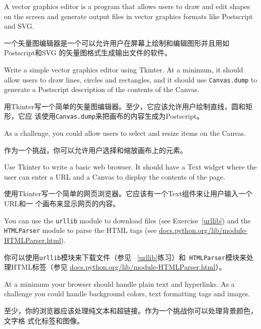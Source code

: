 \documentclass[10pt]{book}
\begin{document}
\begin{CJK}{UTF8}{gbsn}
\begin{exercise}
A vector graphics editor is a program that allows users to draw and
edit shapes on the screen and generate output files in vector graphics
formats like Postscript and SVG.

一个矢量图编辑器是一个可以允许用户在屏幕上绘制和编辑图形并且用如Postscript和SVG
的矢量图格式生成输出文件的软件。

Write a simple vector graphics editor using Tkinter.  At a
minimum, it should allow users to draw lines, circles and
rectangles, and it should use {\tt Canvas.dump} to
generate a Postscript description of the contents of the
Canvas.

用Tkinter写一个简单的矢量图编辑器。至少，它应该允许用户绘制直线，圆和矩形，它应
该使用{\tt Canvas.dump}来把画布的内容生成为Postscript。

As a challenge, you could allow users to select and resize
items on the Canvas.

作为一个挑战，你可以允许用户选择和缩放画布上的元素。


\end{exercise}


\begin{exercise}

Use Tkinter to write a basic web browser.  It
should have a Text widget where the user can enter a URL
and a Canvas to display the contents of the page.

使用Tkinter写一个简单的网页浏览器。它应该有一个Text组件来让用户输入一个URL和一
个画布来显示网页的内容。

You can use the {\tt urllib} module to download files
(see Exercise~\ref{urllib}) and
the {\tt HTMLParser} module to parse the HTML
tags (see \url{docs.python.org/lib/module-HTMLParser.html}).

你可以使用{\tt urllib}模块来下载文件（参见 ~\ref{urllib}练习）和{\tt
HTMLParser}模块来处理HTML标签（参见
\url{docs.python.org/lib/module-HTMLParser.html}）。

At a minimum your browser should handle plain text and hyperlinks.  As
a challenge you could handle background colors, text
formatting tags and images.

至少，你的浏览器应该处理纯文本和超链接。作为一个挑战你可以处理背景颜色，文字格
式化标签和图像。



\end{exercise}
\end{CJK}
\end{document}
